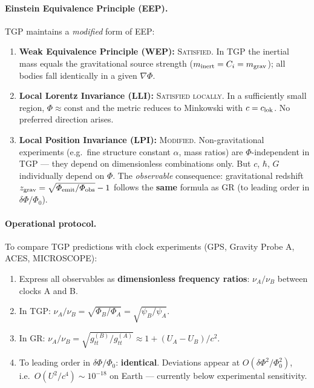 \paragraph{Einstein Equivalence Principle (EEP).}
TGP maintains a \emph{modified} form of EEP:
\begin{enumerate}[nosep]
  \item \textbf{Weak Equivalence Principle (WEP):}
        \textsc{Satisfied.}  In TGP the inertial mass equals the
        gravitational source strength ($m_{\rm inert} = C_i = m_{\rm grav}$);
        all bodies fall identically in a given $\nabla\Phi$.
  \item \textbf{Local Lorentz Invariance (LLI):}
        \textsc{Satisfied locally.}  In a sufficiently small region,
        $\Phi \approx \text{const}$ and the metric reduces to Minkowski
        with $c = c_{\rm lok}$.  No preferred direction arises.
  \item \textbf{Local Position Invariance (LPI):}
        \textsc{Modified.}  Non-gravitational experiments
        (e.g.\ fine structure constant $\alpha$, mass ratios)
        are $\Phi$-independent in TGP --- they depend on
        dimensionless combinations only.  But $c$, $\hbar$, $G$
        individually depend on $\Phi$.
        The \emph{observable} consequence: gravitational redshift
        $z_{\rm grav} = \sqrt{\Phi_{\rm emit}/\Phi_{\rm obs}} - 1$
        follows the \textbf{same} formula as GR (to leading order
        in $\delta\Phi/\Phi_0$).
\end{enumerate}

\paragraph{Operational protocol.}
To compare TGP predictions with clock experiments
(GPS, Gravity Probe A, ACES, MICROSCOPE):
\begin{enumerate}[nosep]
  \item Express all observables as \textbf{dimensionless frequency ratios}:
        $\nu_A/\nu_B$ between clocks A and B.
  \item In TGP: $\nu_A/\nu_B = \sqrt{\Phi_B/\Phi_A} = \sqrt{\psi_B/\psi_A}$.
  \item In GR: $\nu_A/\nu_B = \sqrt{g_{tt}^{(B)}/g_{tt}^{(A)}}
        \approx 1 + (U_A - U_B)/c^2$.
  \item To leading order in $\delta\Phi/\Phi_0$: \textbf{identical}.
        Deviations appear at $O(\delta\Phi^2/\Phi_0^2)$, i.e.\
        $O(U^2/c^4) \sim 10^{-18}$ on Earth --- currently below
        experimental sensitivity.
\end{enumerate}

